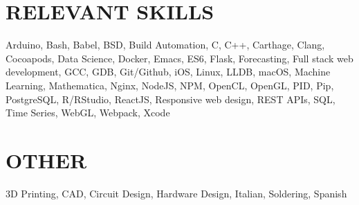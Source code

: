 \documentclass[margin]{../res}
\begin{document}
\begin{resume}
\section{RELEVANT SKILLS}
Arduino, Bash, Babel, BSD, Build Automation, C, C++, Carthage, Clang, Cocoapods, Data Science, Docker, Emacs,
ES6, Flask, Forecasting,
Full stack web development, GCC, GDB, Git/Github, iOS, Linux, LLDB,
macOS, Machine Learning, Mathematica, Nginx, NodeJS, NPM, OpenCL, OpenGL, PID,
Pip, PostgreSQL, R/RStudio, ReactJS, Responsive web design, REST APIs, SQL, Time Series,
WebGL, Webpack, Xcode

  \section{OTHER}
  3D Printing, CAD, Circuit Design,
  Hardware Design, Italian, Soldering, Spanish
 
\end{resume}
\end{document}
